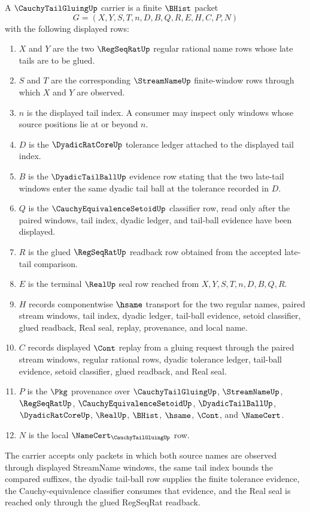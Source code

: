 \begin{definition}\label{def:cauchy-tail-gluing-carrier}
A $\CauchyTailGluingUp$ carrier is a finite $\BHist$ packet
$$
G=(X,Y,S,T,n,D,B,Q,R,E,H,C,P,N)
$$
with the following displayed rows:
\begin{enumerate}
\item $X$ and $Y$ are the two $\RegSeqRatUp$ regular rational name rows whose late tails are to be glued.
\item $S$ and $T$ are the corresponding $\StreamNameUp$ finite-window rows through which $X$ and $Y$ are observed.
\item $n$ is the displayed tail index. A consumer may inspect only windows whose source positions lie at or beyond $n$.
\item $D$ is the $\DyadicRatCoreUp$ tolerance ledger attached to the displayed tail index.
\item $B$ is the $\DyadicTailBallUp$ evidence row stating that the two late-tail windows enter the same dyadic tail ball at the tolerance recorded in $D$.
\item $Q$ is the $\CauchyEquivalenceSetoidUp$ classifier row, read only after the paired windows, tail index, dyadic ledger, and tail-ball evidence have been displayed.
\item $R$ is the glued $\RegSeqRatUp$ readback row obtained from the accepted late-tail comparison.
\item $E$ is the terminal $\RealUp$ seal row reached from $X,Y,S,T,n,D,B,Q,R$.
\item $H$ records componentwise $\hsame$ transport for the two regular names, paired stream windows, tail index, dyadic ledger, tail-ball evidence, setoid classifier, glued readback, Real seal, replay, provenance, and local name.
\item $C$ records displayed $\Cont$ replay from a gluing request through the paired stream windows, regular rational rows, dyadic tolerance ledger, tail-ball evidence, setoid classifier, glued readback, and Real seal.
\item $P$ is the $\Pkg$ provenance over $\CauchyTailGluingUp$, $\StreamNameUp$, $\RegSeqRatUp$, $\CauchyEquivalenceSetoidUp$, $\DyadicTailBallUp$, $\DyadicRatCoreUp$, $\RealUp$, $\BHist$, $\hsame$, $\Cont$, and $\NameCert$.
\item $N$ is the local $\NameCert_{\CauchyTailGluingUp}$ row.
\end{enumerate}
The carrier accepts only packets in which both source names are observed through displayed StreamName windows, the same tail index bounds the compared suffixes, the dyadic tail-ball row supplies the finite tolerance evidence, the Cauchy-equivalence classifier consumes that evidence, and the Real seal is reached only through the glued RegSeqRat readback.
\end{definition}

